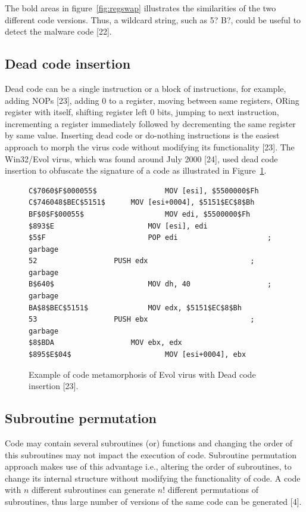 The bold areas in figure~\ref{fig:regswap} illustrates the similarities of the two different code versions. Thus, a wildcard string, such as 5? B?, could be useful to detect the malware code [22]. 

\subsection{Dead code insertion} 

Dead code can be a single instruction or a block of instructions, for example, adding NOPs [23], adding 0 to a register, moving between same registers, ORing register with itself, shifting register left 0 bits, jumping to next instruction, incrementing a register immediately followed by decrementing the same register by same value. Inserting dead code or do-nothing instructions is the easiest approach to morph the virus code without modifying its functionality [23]. 
The Win32/Evol virus, which was found around July 2000 [24], used dead code insertion to obfuscate the signature of a code as illustrated in Figure~\ref{fig:deadcode}. 

\begin{figure}
  \centering
  \begin{lstlisting}[language=myasm]
C$7060$F$000055$				MOV [esi], $5500000$Fh
C$746048$BEC$5151$		MOV [esi+0004], $5151$EC$8$Bh
BF$0$F$00055$					MOV edi, $5500000$Fh
$893$E 						MOV [esi], edi
$5$F 						POP edi						; garbage
52 					PUSH edx						; garbage
B$640$ 						MOV dh, 40 					; garbage
BA$8$BEC$5151$ 				MOV edx, $5151$EC$8$Bh
53 					PUSH ebx						; garbage
$8$BDA					MOV ebx, edx
$895$E$04$						MOV [esi+0004], ebx  
\end{lstlisting}
    \caption[Example of code metamorphosis of Evol virus ]{Example of code metamorphosis of Evol virus with Dead code insertion [23].}
    \label{fig:deadcode}
\end{figure}

\subsection{Subroutine permutation} 

Code may contain several subroutines (or) functions and changing the order of this subroutines may not impact the execution of code. Subroutine permutation approach makes use of this advantage i.e., altering the order of subroutines, to change its internal structure without modifying the functionality of code. A code with $n$ different subroutines can generate $n!$ different permutations of subroutines, thus large number of versions of the same code can be generated [4].

